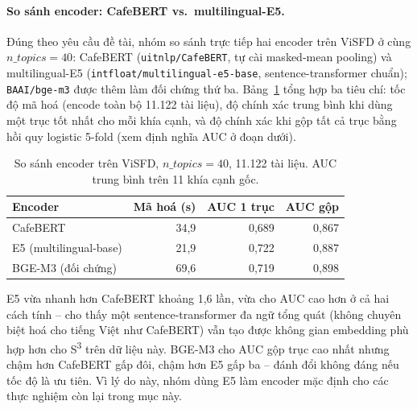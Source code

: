 \documentclass[11pt]{article}
\begin{document}
\paragraph{So sánh encoder: CafeBERT vs.\ multilingual-E5.} Đúng theo yêu
cầu đề tài, nhóm so sánh trực tiếp hai encoder trên ViSFD ở cùng
$n\_topics=40$: CafeBERT (\texttt{uitnlp/CafeBERT}, tự cài masked-mean
pooling) và multilingual-E5 (\texttt{intfloat/multilingual-e5-base},
sentence-transformer chuẩn); \texttt{BAAI/bge-m3} được thêm làm đối chứng
thứ ba. Bảng~\ref{tab:encoder-comparison} tổng hợp ba tiêu chí: tốc độ mã
hoá (encode toàn bộ 11.122 tài liệu), độ chính xác trung bình khi dùng một
trục tốt nhất cho mỗi khía cạnh, và độ chính xác khi gộp tất cả trục bằng
hồi quy logistic 5-fold (xem định nghĩa AUC ở đoạn dưới).

\begin{table}[t]
    \centering
    \small
    \begin{tabular}{@{}l r r r@{}}
        \toprule
        \textbf{Encoder} & \textbf{Mã hoá (s)} & \textbf{AUC 1 trục} & \textbf{AUC gộp} \\
        \midrule
        CafeBERT & 34,9 & 0,689 & 0,867 \\
        E5 (multilingual-base) & 21,9 & 0,722 & 0,887 \\
        BGE-M3 (đối chứng) & 69,6 & 0,719 & 0,898 \\
        \bottomrule
    \end{tabular}
    \caption{So sánh encoder trên ViSFD, $n\_topics=40$, 11.122 tài liệu.
    AUC trung bình trên 11 khía cạnh gốc.}
    \label{tab:encoder-comparison}
\end{table}

E5 vừa nhanh hơn CafeBERT khoảng 1,6 lần, vừa cho AUC cao hơn ở cả hai
cách tính -- cho thấy một sentence-transformer đa ngữ tổng quát (không
chuyên biệt hoá cho tiếng Việt như CafeBERT) vẫn tạo được không gian
embedding phù hợp hơn cho S\textsuperscript{3} trên dữ liệu này. BGE-M3
cho AUC gộp trục cao nhất nhưng chậm hơn CafeBERT gấp đôi, chậm hơn E5 gấp
ba -- đánh đổi không đáng nếu tốc độ là ưu tiên. Vì lý do này, nhóm dùng E5
làm encoder mặc định cho các thực nghiệm còn lại trong mục này.
\end{document}
